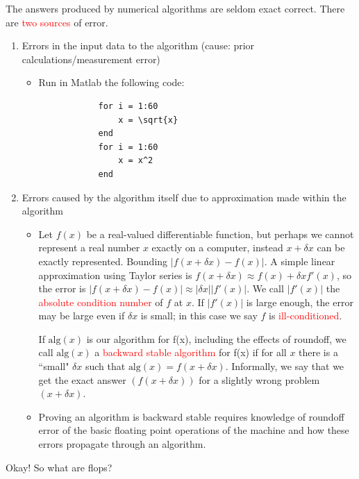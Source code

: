 \documentclass{ximera}
\begin{document}
The answers produced by numerical algorithms are seldom exact correct.  There are \textcolor{red}{two sources} of error. 
\begin{enumerate}
    \item Errors in the input data to the algorithm (cause: prior calculations/measurement error) 
    \begin{itemize}
        \item Run in Matlab the following code:
        \begin{verbatim}
            for i = 1:60
                x = \sqrt{x}
            end
            for i = 1:60
                x = x^2
            end
        \end{verbatim}
    \end{itemize}
    \item Errors caused by the algorithm itself due to approximation made within the algorithm
    \begin{itemize}
        \item Let $f(x)$ be a real-valued differentiable function, but perhaps we cannot represent a real number $x$ exactly on a computer, instead $x + \delta x$ can be exactly represented.  Bounding $|f(x+\delta x) - f(x)|$.  A simple linear approximation using Taylor series is $f(x+\delta x) \approx f(x) + \delta x f'(x)$, so the error is $|f(x+\delta x) - f(x)| \approx |\delta x| |f'(x)|$.  We call $|f'(x)|$ the \textcolor{red}{absolute condition number} of $f$ at $x$.  If $|f'(x)|$ is large enough, the error may be large even if $\delta x$ is small; in this case we say $f$ is \textcolor{red}{ill-conditioned}.
        \begin{definition}
            If $\text{alg}(x)$ is our algorithm for f(x), including the effects of roundoff, we call $\text{alg}(x)$ a \textcolor{red}{backward stable algorithm} for f(x) if for all $x$ there is a  ``small" $\delta x$ such that $\text{alg}(x) = f(x+\delta x)$.  Informally, we say that we get the exact answer $(f(x+\delta x))$ for a slightly wrong problem $(x+\delta x)$.
        \end{definition}
        \item Proving an algorithm is backward stable requires knowledge of roundoff error of the basic floating point operations of the machine and how these errors propagate through an algorithm.
    \end{itemize}
\end{enumerate}

Okay!  So what are flops?
\end{document}
